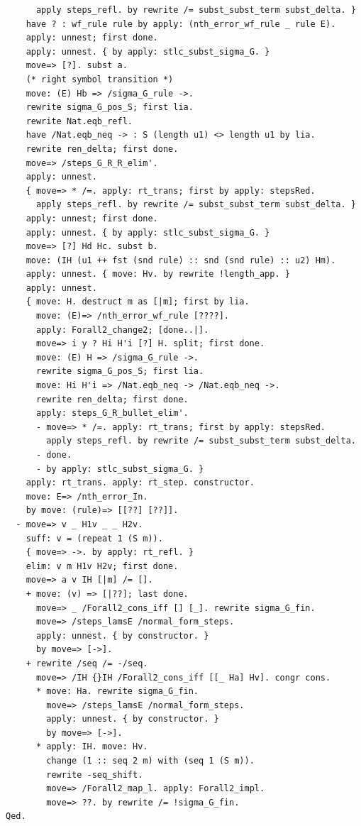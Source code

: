 \documentclass[10pt,a4paper]{amsart}
\begin{document}
\begin{lstlisting}
      apply steps_refl. by rewrite /= subst_subst_term subst_delta. }
    have ? : wf_rule rule by apply: (nth_error_wf_rule _ rule E).
    apply: unnest; first done.
    apply: unnest. { by apply: stlc_subst_sigma_G. }
    move=> [?]. subst a.
    (* right symbol transition *)
    move: (E) Hb => /sigma_G_rule ->.
    rewrite sigma_G_pos_S; first lia.
    rewrite Nat.eqb_refl.
    have /Nat.eqb_neq -> : S (length u1) <> length u1 by lia.
    rewrite ren_delta; first done.
    move=> /steps_G_R_R_elim'.
    apply: unnest.
    { move=> * /=. apply: rt_trans; first by apply: stepsRed.
      apply steps_refl. by rewrite /= subst_subst_term subst_delta. }
    apply: unnest; first done.
    apply: unnest. { by apply: stlc_subst_sigma_G. }
    move=> [?] Hd Hc. subst b.
    move: (IH (u1 ++ fst (snd rule) :: snd (snd rule) :: u2) Hm).
    apply: unnest. { move: Hv. by rewrite !length_app. }
    apply: unnest.
    { move: H. destruct m as [|m]; first by lia.
      move: (E)=> /nth_error_wf_rule [????].
      apply: Forall2_change2; [done..|].
      move=> i y ? Hi H'i [?] H. split; first done.
      move: (E) H => /sigma_G_rule ->.
      rewrite sigma_G_pos_S; first lia.
      move: Hi H'i => /Nat.eqb_neq -> /Nat.eqb_neq ->.
      rewrite ren_delta; first done.
      apply: steps_G_R_bullet_elim'.
      - move=> * /=. apply: rt_trans; first by apply: stepsRed.
        apply steps_refl. by rewrite /= subst_subst_term subst_delta.
      - done.
      - by apply: stlc_subst_sigma_G. }
    apply: rt_trans. apply: rt_step. constructor.
    move: E=> /nth_error_In.
    by move: (rule)=> [[??] [??]].
  - move=> v _ H1v _ _ H2v.
    suff: v = (repeat 1 (S m)).
    { move=> ->. by apply: rt_refl. }
    elim: v m H1v H2v; first done.
    move=> a v IH [|m] /= [].
    + move: (v) => [|??]; last done.
      move=> _ /Forall2_cons_iff [] [_]. rewrite sigma_G_fin.
      move=> /steps_lamsE /normal_form_steps.
      apply: unnest. { by constructor. }
      by move=> [->].
    + rewrite /seq /= -/seq.
      move=> /IH {}IH /Forall2_cons_iff [[_ Ha] Hv]. congr cons.
      * move: Ha. rewrite sigma_G_fin.
        move=> /steps_lamsE /normal_form_steps.
        apply: unnest. { by constructor. }
        by move=> [->].
      * apply: IH. move: Hv.
        change (1 :: seq 2 m) with (seq 1 (S m)).
        rewrite -seq_shift.
        move=> /Forall2_map_l. apply: Forall2_impl.
        move=> ??. by rewrite /= !sigma_G_fin.
Qed.


\end{lstlisting}
\end{document}
